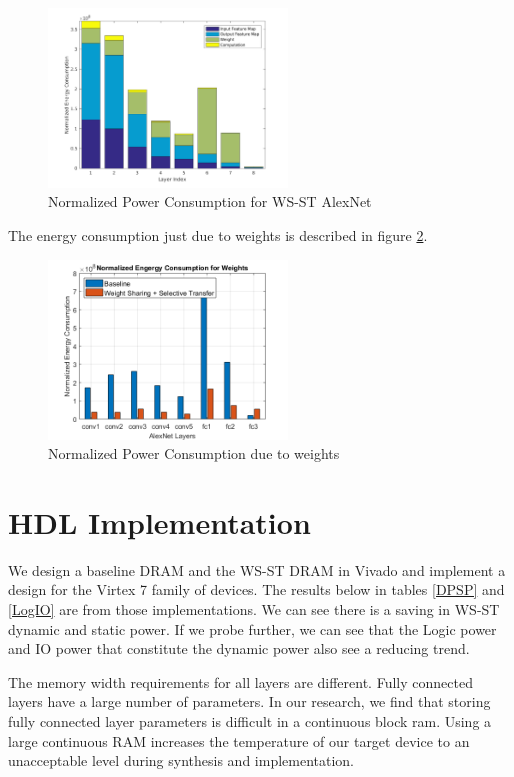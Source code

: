 \documentclass[conference]{IEEEtran}
\begin{document}
\begin{figure}[!ht]
\centering
\includegraphics[width=2.5in]{EnergyVisualization_WSAlexNet}
\caption{Normalized Power Consumption for WS-ST AlexNet}
\label{Power_Est_2}
\end{figure}

The energy consumption just due to weights is described in figure \ref{Power_Est_3}. 

\begin{figure}[!ht]
\centering
\includegraphics[width=2.5in]{Power_Est}
\caption{Normalized Power Consumption due to weights}
\label{Power_Est_3}
\end{figure}

\section{HDL Implementation}
We design a baseline DRAM and the WS-ST DRAM in Vivado and implement a design for the Virtex 7 family of devices. The results below in tables \ref{DPSP} and \ref{LogIO} are from those implementations. We can see there is a saving in WS-ST dynamic and static power. If we probe further, we can see that the Logic power and IO power that constitute the dynamic power also see a reducing trend. 

The memory width requirements for all layers are different. Fully connected layers have a large number of parameters. In our research, we find that storing fully connected layer parameters is difficult in a continuous block ram. Using a large continuous RAM increases the temperature of our target device to an unacceptable level during synthesis and implementation. 
\end{document}
